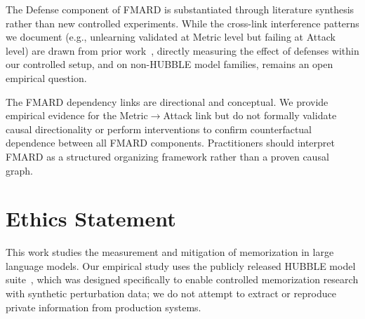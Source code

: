 \documentclass[11pt]{article}
\begin{document}
The Defense component of FMARD is substantiated through literature synthesis
rather than new controlled experiments.
While the cross-link interference patterns we document (e.g., unlearning
validated at Metric level but failing at Attack level) are drawn from prior
work~\citep{wei2025hubble, nasr2023scalableextractiontrainingdata}, directly
measuring the effect of defenses within our controlled setup, and on
non-HUBBLE model families, remains an open empirical question.

The FMARD dependency links are directional and conceptual.
We provide empirical evidence for the Metric$\to$Attack link but do not
formally validate causal directionality or perform interventions to confirm
counterfactual dependence between all FMARD components.
Practitioners should interpret FMARD as a structured organizing framework
rather than a proven causal graph.


\section*{Ethics Statement}

This work studies the measurement and mitigation of memorization in large
language models.
Our empirical study uses the publicly released HUBBLE model
suite~\citep{wei2025hubble}, which was designed specifically to enable
controlled memorization research with synthetic perturbation data; we do not
attempt to extract or reproduce private information from production systems.
\end{document}
